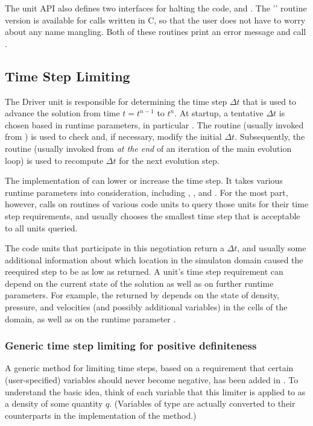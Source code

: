 The  unit API also defines two interfaces for halting the code,
 and
\newline %
.
The '' routine
version is available for calls written in C, so that the user does not have to worry about
any name mangling.  Both of these routines print an error message and
call .


\subsection{Time Step Limiting}
The \unit{Driver} unit is responsible for determining the time step $\Delta t$
that is used to advance the solution from time $t=t^{n-1}$ to $t^n$.
At startup, a tentative $\Delta t$ is chosen based in runtime parameters,
in particular .
The routine  (usually invoked from ) is used to check and,
if necessary, modify the initial $\Delta t$.
Subsequently, the routine  (usually invoked from  {\em at the end}
of an iteration of the main evolution loop) is used to recompute $\Delta t$
for the next evolution step.

The implementation of  can lower or increase the
time step. It takes various runtime parameters into consideration,
including
,
, and
.
For the most part, however,  calls on
 routines of various code units to query those
units for their time step requirements, and usually chooses the smallest
time step that is acceptable to all units queried.

The code units that participate in this negotiation return a $\Delta t$,
and usually some additional information about which location in the
simulaton domain caused the reequired step to be as low as returned.
A unit's time step requirement can depend on the current state of the
solution as well as on further runtime parameters.
For example, the  returned by 
depends on the state of density, pressure, and velocities (and possibly
additional variables) in the cells of the domain, as well as on
the runtime parameter .


\subsubsection{Generic time step limiting for positive definiteness}
\label{Sec:dr_posdef}
A generic method for limiting time steps, based on a requirement that certain (user-specified)
variables should never become negative, has been added in \flashx.
To understand the basic idea, think of each variable that this limiter is applied
to as a density of some quantity $q$. (Variables of  type are actually converted to
their  counterparts in the implementation of the method.)

